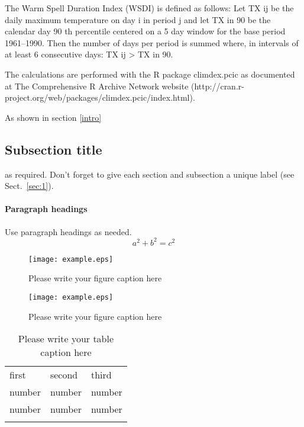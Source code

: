 The Warm Spell Duration Index (WSDI) is defined as follows: Let TX ij be the daily maximum temperature on day i in period j and let TX in 90 be the calendar day 90 th percentile centered on a 5 day window for the base period 1961–1990. Then the number of days per period is summed where, in intervals of at least 6 consecutive days: TX ij > TX in 90.

The calculations are performed with the R package climdex.pcic as documented at The Comprehensive R Archive Network website (http://cran.r-project.org/web/packages/climdex.pcic/index.html).  

As shown in section \ref{intro}
\label{sec:1}
\subsection{Subsection title}
\label{sec:2}
as required. Don't forget to give each section
and subsection a unique label (see Sect.~\ref{sec:1}).
\paragraph{Paragraph headings} Use paragraph headings as needed.
\begin{equation}
a^2+b^2=c^2
\end{equation}

\begin{figure}
  \texttt{[image: example.eps]}
\caption{Please write your figure caption here}
\label{fig:1}       %
\end{figure}
%
\begin{figure*}
  \texttt{[image: example.eps]}
\caption{Please write your figure caption here}
\label{fig:2}       %
\end{figure*}
%
\begin{table}
\caption{Please write your table caption here}
\label{tab:1}       %
\begin{tabular}{lll}
\hline\noalign{\smallskip}
first & second & third  \\
\noalign{\smallskip}\hline\noalign{\smallskip}
number & number & number \\
number & number & number \\
\noalign{\smallskip}\hline
\end{tabular}
\end{table}


